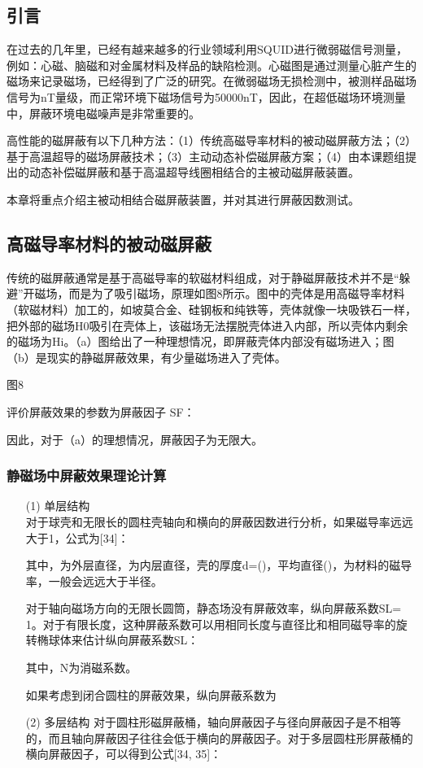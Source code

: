 \documentclass[a4paper,12pt，twoside]{ctexart}
\begin{document}
	\subsection{引言}
	在过去的几年里，已经有越来越多的行业领域利用SQUID进行微弱磁信号测量，例如：心磁、脑磁和对金属材料及样品的缺陷检测。心磁图是通过测量心脏产生的磁场来记录磁场，已经得到了广泛的研究。在微弱磁场无损检测中，被测样品磁场信号为nT量级，而正常环境下磁场信号为50000nT，因此，在超低磁场环境测量中，屏蔽环境电磁噪声是非常重要的。\par
	高性能的磁屏蔽有以下几种方法：（1）传统高磁导率材料的被动磁屏蔽方法；（2）基于高温超导的磁场屏蔽技术；（3）主动动态补偿磁屏蔽方案；（4）由本课题组提出的动态补偿磁屏蔽和基于高温超导线圈相结合的主被动磁屏蔽装置。\par
	本章将重点介绍主被动相结合磁屏蔽装置，并对其进行屏蔽因数测试。
	\subsection{高磁导率材料的被动磁屏蔽}
	传统的磁屏蔽通常是基于高磁导率的软磁材料组成，对于静磁屏蔽技术并不是“躲避”开磁场，而是为了吸引磁场，原理如图8所示。图中的壳体是用高磁导率材料（软磁材料）加工的，如坡莫合金、硅钢板和纯铁等，壳体就像一块吸铁石一样，把外部的磁场H0吸引在壳体上，该磁场无法摆脱壳体进入内部，所以壳体内剩余的磁场为Hi。（a）图给出了一种理想情况，即屏蔽壳体内部没有磁场进入；图（b）是现实的静磁屏蔽效果，有少量磁场进入了壳体。\par
	
	图8 \par
	
	评价屏蔽效果的参数为屏蔽因子 SF：\par
	
	因此，对于（a）的理想情况，屏蔽因子为无限大。
	
	\subsubsection{静磁场中屏蔽效果理论计算}
	
	\begin{enumerate}
		\item [(1)]单层结构\\
		对于球壳和无限长的圆柱壳轴向和横向的屏蔽因数进行分析，如果磁导率远远大于1，公式为[34]：\par
		其中，为外层直径，为内层直径，壳的厚度d=()，平均直径()，为材料的磁导率，一般会远远大于半径。\par
		对于轴向磁场方向的无限长圆筒，静态场没有屏蔽效率，纵向屏蔽系数SL= 1。对于有限长度，这种屏蔽系数可以用相同长度与直径比和相同磁导率的旋转椭球体来估计纵向屏蔽系数SL：\par
		
		其中，N为消磁系数。\par
		如果考虑到闭合圆柱的屏蔽效果，纵向屏蔽系数为\par
		
		
		
		\item [(2)]多层结构
		对于圆柱形磁屏蔽桶，轴向屏蔽因子与径向屏蔽因子是不相等的，而且轴向屏蔽因子往往会低于横向的屏蔽因子。对于多层圆柱形屏蔽桶的横向屏蔽因子，可以得到公式[34, 35]：\par
	\end{enumerate}
	
\end{document}
